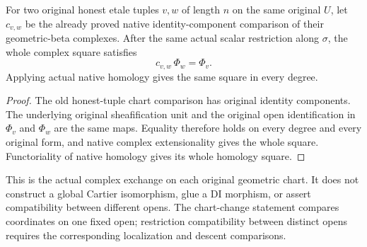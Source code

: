 \begin{theorem}
\label{thm:cartier-geometric-chart-complex-transition}
\leanok
{}
For two original honest etale tuples $v,w$ of length $n$ on the same
original $U$, let $c_{v,w}$ be the already proved native
identity-component comparison of their geometric-beta complexes.
After the same actual scalar restriction along $\sigma$, the whole
complex square satisfies
\[
 c_{v,w}\,\Phi_w=\Phi_v.
\]
Applying actual native homology gives the same square in every degree.
\end{theorem}
\begin{proof}
The old honest-tuple chart comparison has original identity components.
The underlying original sheafification unit and the original open
identification in $\Phi_v$ and $\Phi_w$ are the same maps.
Equality therefore holds on every degree and every original form,
and native complex extensionality gives the whole square. Functoriality
of native homology gives its whole homology square.
\end{proof}

This is the actual complex exchange on each original geometric chart.
It does not construct a global Cartier isomorphism, glue a DI morphism,
or assert compatibility between different opens. The chart-change statement compares coordinates on one fixed open;
restriction compatibility between distinct opens requires the corresponding
localization and descent comparisons.
